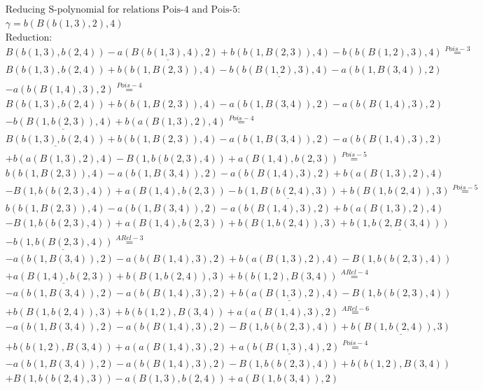 \documentclass[11pt]{amsart}
\begin{document}
\begin{align*} 
& \text{Reducing S-polynomial for relations Pois-4 and Pois-5:} \\ 
& \gamma = b(B(b(1,3),2),4) \\ 
& \text{Reduction}: \\&B(b(1,3),b(2,4)) - \underline{a(B(b(1,3),4),2)} + b(b(1,B(2,3)),4) - b(b(B(1,2),3),4) \stackrel{ Pois-3 }{=}  \\ 
&B(b(1,3),b(2,4)) + b(b(1,B(2,3)),4) - \underline{b(b(B(1,2),3),4)} - a(b(1,B(3,4)),2)\\ 
 &  - a(b(B(1,4),3),2) \stackrel{ Pois-4 }{=}  \\ 
&B(b(1,3),b(2,4)) + b(b(1,B(2,3)),4) - a(b(1,B(3,4)),2) - a(b(B(1,4),3),2)\\ 
 &  - \underline{b(B(1,b(2,3)),4)} + b(a(B(1,3),2),4) \stackrel{ Pois-4 }{=}  \\ 
&\underline{B(b(1,3),b(2,4))} + b(b(1,B(2,3)),4) - a(b(1,B(3,4)),2) - a(b(B(1,4),3),2)\\ 
 &  + b(a(B(1,3),2),4) - B(1,b(b(2,3),4)) + a(B(1,4),b(2,3)) \stackrel{ Pois-5 }{=}  \\ 
&b(b(1,B(2,3)),4) - a(b(1,B(3,4)),2) - a(b(B(1,4),3),2) + b(a(B(1,3),2),4)\\ 
 &  - B(1,b(b(2,3),4)) + a(B(1,4),b(2,3)) - \underline{b(1,B(b(2,4),3))} + b(B(1,b(2,4)),3) \stackrel{ Pois-5 }{=}  \\ 
&b(b(1,B(2,3)),4) - a(b(1,B(3,4)),2) - a(b(B(1,4),3),2) + b(a(B(1,3),2),4)\\ 
 &  - B(1,b(b(2,3),4)) + a(B(1,4),b(2,3)) + b(B(1,b(2,4)),3) + \underline{b(1,b(2,B(3,4)))}\\ 
 &  - \underline{b(1,b(B(2,3),4))} \stackrel{ ARel-3 }{=}  \\ 
& - a(b(1,B(3,4)),2) - a(b(B(1,4),3),2) + b(a(B(1,3),2),4) - B(1,b(b(2,3),4))\\ 
 &  + \underline{a(B(1,4),b(2,3))} + b(B(1,b(2,4)),3) + b(b(1,2),B(3,4)) \stackrel{ ARel-4 }{=}  \\ 
& - a(b(1,B(3,4)),2) - a(b(B(1,4),3),2) + \underline{b(a(B(1,3),2),4)} - B(1,b(b(2,3),4))\\ 
 &  + b(B(1,b(2,4)),3) + b(b(1,2),B(3,4)) + a(a(B(1,4),3),2) \stackrel{ ARel-6 }{=}  \\ 
& - a(b(1,B(3,4)),2) - a(b(B(1,4),3),2) - B(1,b(b(2,3),4)) + \underline{b(B(1,b(2,4)),3)}\\ 
 &  + b(b(1,2),B(3,4)) + a(a(B(1,4),3),2) + \underline{a(b(B(1,3),4),2)} \stackrel{ Pois-4 }{=}  \\ 
& - a(b(1,B(3,4)),2) - a(b(B(1,4),3),2) - B(1,b(b(2,3),4)) + b(b(1,2),B(3,4))\\ 
 &  + B(1,b(b(2,4),3)) - a(B(1,3),b(2,4)) + a(B(1,b(3,4)),2)\\ 
\end{align*} 
 
\end{document}
